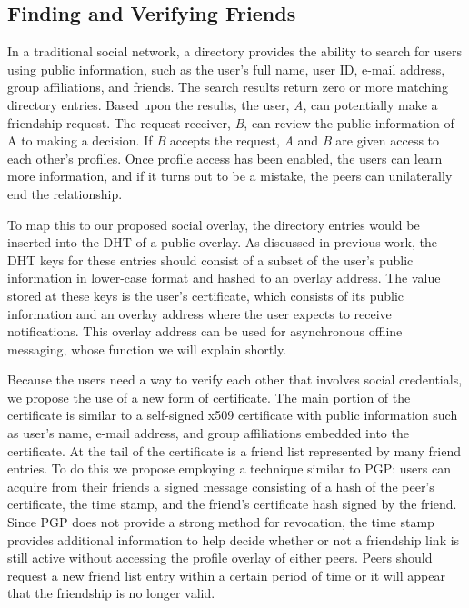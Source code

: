 \documentclass[letterpaper,twocolumn,10pt]{article}
\begin{document}
\subsection{Finding and Verifying Friends}
In a traditional social network, a directory provides the ability to search
for users using public information, such as the user's full name, user ID,
e-mail address, group affiliations, and friends.  The search results return zero
or more matching directory entries.  Based upon the results, the user,
\textit{A}, can potentially make a friendship request.  The request receiver,
\textit{B}, can review the public information of A to making a decision.  If
\textit{B} accepts the request, \textit{A} and \textit{B} are given access to
each other's profiles.  Once profile access has been enabled, the users can
learn more information, and if it turns out to be a mistake, the peers can
unilaterally end the relationship.

To map this to our proposed social overlay, the directory entries would be
inserted into the DHT of a public overlay.  As discussed in previous work, the
DHT keys for these entries should consist of a subset of the user's
public information in lower-case format and hashed to an overlay  address.  The
value stored at these keys is the user's certificate, which consists of its public
information and an overlay address where the user expects to receive
notifications.  This overlay address can be used for asynchronous offline
messaging, whose function we will explain shortly.

Because the users need a way to verify each other that involves social credentials,
we propose the use of a new form of certificate.
The main portion of the certificate is similar to a self-signed
x509 certificate with public information such as user's name, e-mail
address, and group affiliations embedded into the certificate.  At the tail of
the certificate is a friend list represented by many friend entries.  To do this
we propose employing a technique similar to PGP: users can acquire from their
friends a signed message consisting of a hash of the peer's certificate, the
time stamp, and the friend's certificate hash signed by the friend.  Since PGP
does not provide a strong method for revocation, the time stamp provides
additional information to help decide whether or not a friendship link is still
active without accessing the profile overlay of either peers.  Peers should
request a new friend list entry within a certain period of time or it will
appear that the friendship is no longer valid.
\end{document}
